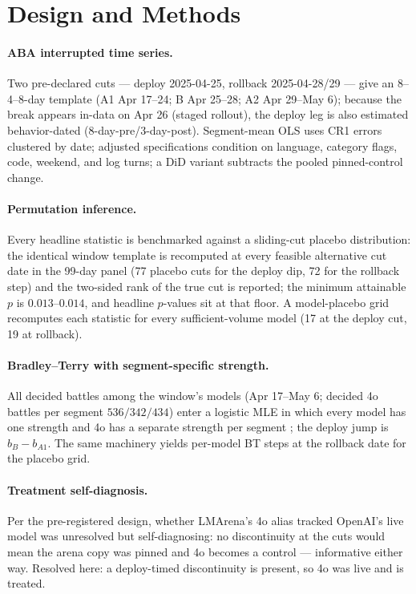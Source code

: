 \documentclass[11pt]{article}
\begin{document}
\section{Design and Methods}\label{sec:methods}

\paragraph{ABA interrupted time series.} Two pre-declared cuts --- deploy
2025-04-25, rollback 2025-04-28/29 --- give an 8--4--8-day template (A1 Apr
17--24; B Apr 25--28; A2 Apr 29--May 6); because the break appears in-data on
Apr 26 (staged rollout), the deploy leg is also estimated behavior-dated
(8-day-pre/3-day-post). Segment-mean OLS uses CR1 errors clustered by date;
adjusted specifications condition on language, category flags, code, weekend,
and log turns; a DiD variant subtracts the pooled pinned-control change.

\paragraph{Permutation inference.} Every headline statistic is benchmarked
against a sliding-cut placebo distribution: the identical window template is
recomputed at every feasible alternative cut date in the 99-day panel (77
placebo cuts for the deploy dip, 72 for the rollback step) and the two-sided
rank of the true cut is reported; the minimum attainable $p$ is
$0.013$--$0.014$, and headline $p$-values sit at that floor. A model-placebo
grid recomputes each statistic for every sufficient-volume model (17 at the
deploy cut, 19 at rollback).

\paragraph{Bradley--Terry with segment-specific strength.} All decided battles
among the window's models (Apr 17--May 6; decided 4o battles per segment
$536/342/434$) enter a logistic MLE in which every model has one strength and
4o has a separate strength per segment \cite{bradleyterry1952}; the deploy
jump is $b_B - b_{A1}$. The same machinery yields per-model BT steps at the
rollback date for the placebo grid.

\paragraph{Treatment self-diagnosis.} Per the pre-registered design, whether
LMArena's 4o alias tracked OpenAI's live model was unresolved but
self-diagnosing: no discontinuity at the cuts would mean the arena copy was
pinned and 4o becomes a control --- informative either way. Resolved here: a
deploy-timed discontinuity is present, so 4o was live and is treated.
\end{document}
